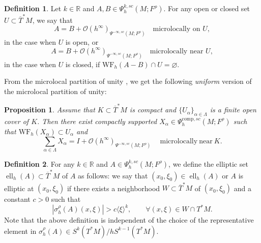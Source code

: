 \documentclass[11pt,oneside,reqno]{amsart}
\newcommand\R{\ensuremath{\mathbb{R}}}
\newtheorem{proposition}[theorem]{Proposition}
\theoremstyle{definition}
\newtheorem{definition}{Definition}[section]
\numberwithin{equation}{section}
\theoremstyle{plain}
\begin{document}
\begin{definition}
    Let $k\in \R$ and $A,B \in \Psi_h^{k,sc}(M;F^\rho)$. For any open or closed set $U \subset \overline{T}^* M$, we say that 
    \begin{equation*}
        A=B+\mathcal{O}(h^{\infty})_{\Psi^{-\infty,sc}(M;F^\rho)}\quad \text{microlocally on } U,
    \end{equation*}
    in the case when $U$ is open, or
    \begin{equation*}
        A=B+\mathcal{O}(h^{\infty})_{\Psi^{-\infty,sc}(M;F^\rho)}\quad \text{microlocally near } U,
    \end{equation*}
    in the case when $U$ is closed, if $\mathrm{WF}_{h}(A-B)\cap U=\varnothing$.
\end{definition}



From the microlocal partition of unity \cite[Proposition E.30]{dyatlovzworski2019resonances}, we get the following \emph{uniform} version of the microlocal partition of unity:
\begin{proposition}\label{microlocalpartitionofunity}
Assume that $K \subset \overline{T}^* M$ is compact and
$\{U_{\alpha}\}_{\alpha \in \Lambda}$ is a finite open cover of $K$. Then there exist compactly supported $X_{\alpha} \in \Psi_h^{\mathrm{comp},sc}(M;F^{\rho})$ such that $\mathrm{WF}_h (X_{\alpha} ) \subset U_{\alpha}$ and
\begin{equation*}
    \sum_{\alpha \in \Lambda} X_{\alpha}=I+\mathcal{O}(h^{\infty})_{\Psi^{-\infty,sc}(M;F^{\rho})} \quad \mathrm{ \ microlocally\ near\ } K .
\end{equation*}
\end{proposition}

\begin{definition}
    For any $k\in \R$ and $A \in \Psi^{k,sc}_{h}(M;F^\rho)$, we define the elliptic set $\operatorname{ell}_h(A) \subset \overline{T}^*M$ of $A$ as follows: we say that $(x_0,\xi_0) \in \operatorname{ell}_h(A)$ or $A$ is elliptic at $(x_0,\xi_0)$ if there exists a neighborhood $W \subset \overline{T}^*M$ of $(x_0,\xi_0)$ and a constant $c>0$ such that 
    \begin{equation*}
        |\sigma^\rho_h(A)(x,\xi)|>c\langle \xi \rangle^k,\qquad \forall (x,\xi) \in W\cap T^*M.
    \end{equation*}
    Note that the above definition is independent of the choice of the representative element in $\sigma^\rho_{h}(A) \in S^k(T^*M)/hS^{k-1}(T^*M)$.
\end{definition}
\end{document}
